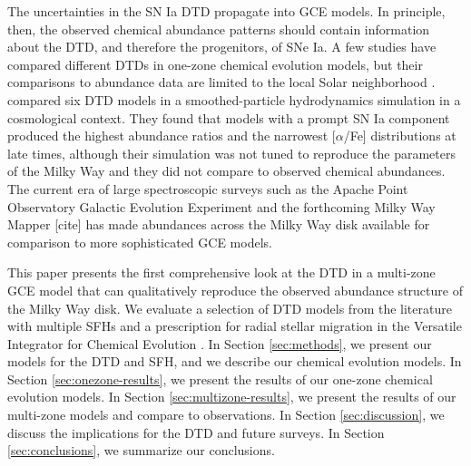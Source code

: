 \documentclass[twocolumn,twocolappendix,linenumbers,trackchanges]{aastex631}
\newcommand{\aFe}{[$\alpha$/Fe]\xspace}
\begin{document}
The uncertainties in the SN Ia DTD propagate into GCE models. In principle, then, the observed chemical abundance patterns should contain information about the DTD, and therefore the progenitors, of SNe Ia.
A few studies have compared different DTDs in one-zone chemical evolution models, but their comparisons to abundance data are limited to the local Solar neighborhood \citep[e.g.,][]{Andrews2017-ChemicalEvolution,Palicio2023-AnalyticDTD}. 
\citet{Poulhazan2018-PrecisionPollution} compared six DTD models in a smoothed-particle hydrodynamics simulation in a cosmological context. They found that models with a prompt SN Ia component produced the highest abundance ratios and the narrowest \aFe distributions at late times, although their simulation was not tuned to reproduce the parameters of the Milky Way and they did not compare to observed chemical abundances. 
The current era of large spectroscopic surveys such as the Apache Point Observatory Galactic Evolution Experiment \citep[APOGEE;][]{Majewski2017-APOGEE} and the forthcoming Milky Way Mapper [cite] has made abundances across the Milky Way disk available for comparison to more sophisticated GCE models.


This paper presents the first comprehensive look at the DTD in a multi-zone GCE model that can qualitatively reproduce the observed abundance structure of the Milky Way disk. We evaluate a selection of DTD models from the literature with multiple SFHs and a prescription for radial stellar migration in the Versatile Integrator for Chemical Evolution \citep[VICE;][]{JohnsonWeinberg2020-Starbursts}. In Section \ref{sec:methods}, we present our models for the DTD and SFH, and we describe our chemical evolution models. In Section \ref{sec:onezone-results}, we present the results of our one-zone chemical evolution models. In Section \ref{sec:multizone-results}, we present the results of our multi-zone models and compare to observations. In Section \ref{sec:discussion}, we discuss the implications for the DTD and future surveys. In Section \ref{sec:conclusions}, we summarize our conclusions.
\end{document}

